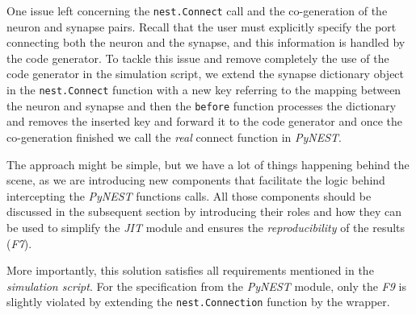 One issue left concerning the \texttt{nest.Connect} call and the co-generation of the neuron and synapse pairs. Recall that the user must explicitly specify the port connecting both the neuron and the synapse, and this information is handled by the code generator. To tackle this issue and remove completely the use of the code generator in the simulation script, we extend the synapse dictionary object in the \texttt{nest.Connect} function with a new key referring to the mapping between the neuron and synapse and then the \texttt{before} function processes the dictionary and removes the inserted key and forward it to the code generator and once the co-generation finished we call the \emph{real} connect function in \emph{PyNEST}.


The approach might be simple, but we have a lot of things happening behind the scene, as we are introducing new components that facilitate the logic behind intercepting the \emph{PyNEST} functions calls. All those components should be discussed in the subsequent section by introducing their roles and how they can be used to simplify the \emph{JIT} module and ensures the \emph{reproducibility} of the results (\emph{F7}).


More importantly, this solution satisfies all requirements mentioned in the \emph{simulation script}. For the specification from the \emph{PyNEST} module, only the \emph{F9} is slightly violated by extending the \texttt{nest.Connection} function by the wrapper.





